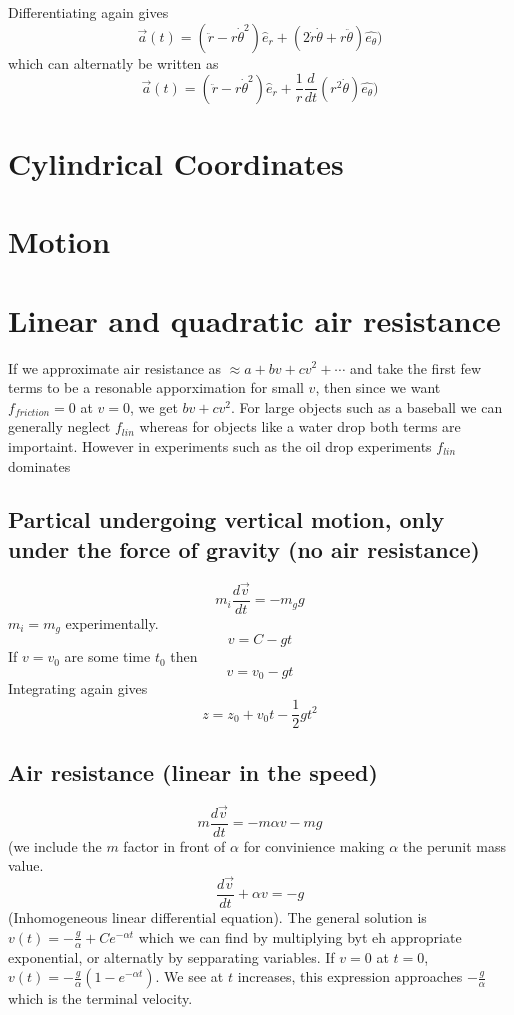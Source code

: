 \documentclass{homework}
\begin{document}
Differentiating again gives 
\[\vec{a}(t) = (\ddot{r} - r\dot{\theta}^2)\hat e_r + (2\dot{r}\dot{\theta} + r\ddot{\theta})\hat{e_{\theta}})\]
which can alternatly be written as
\[\vec{a}(t) = (\ddot{r} - r\dot{\theta}^2)\hat e_r + \frac{1}{r}\frac{d}{dt}(r^2\dot{\theta})\hat{e_{\theta}})\]


\section{Cylindrical Coordinates}

\section{Motion}
\section{Linear and quadratic air resistance}
If we approximate air resistance as $\approx a + bv + cv^2 + \cdots$ and take the first few terms to be a resonable apporximation for small $v$, then since we want $f_{friction} = 0$ at $v = 0$, we get $bv + cv^2$. For large objects such as a baseball we can generally neglect $f_{lin}$ whereas for objects like a water drop both terms are importaint. However in experiments such as the oil drop experiments $f_{lin}$ dominates

\subsection{Partical undergoing vertical motion, only under the force of gravity (no air resistance)}
\[m_i\frac{d\vec {v}}{dt} = -m_g g\]
$m_i = m_g$ experimentally.
\[v = C - gt\]
If $v = v_0$ are some time $t_0$ then
\[v = v_0 - gt\]
Integrating again gives
\[z = z_0 + v_0t - \frac{1}{2}gt^2\]
\subsection{Air resistance (linear in the speed)}
\[m\frac{d\vec {v}}{dt} = -m\alpha v-m g\]
(we include the $m$ factor in front of $\alpha$ for convinience making $\alpha$ the perunit mass value.
\[\frac{d\vec {v}}{dt} +\alpha v = - g\]
(Inhomogeneous linear differential equation). The general solution is $v(t) = -\frac{g}{\alpha} + Ce^{-\alpha t}$ which we can find by multiplying byt eh appropriate exponential, or alternatly by sepparating variables. If $v = 0$ at $t = 0$, $v(t) = -\frac{g}{\alpha}(1 - e^{-\alpha t})$. We see at $t$ increases, this expression approaches $-\frac{g}{\alpha}$ which is the terminal velocity.
\end{document}
